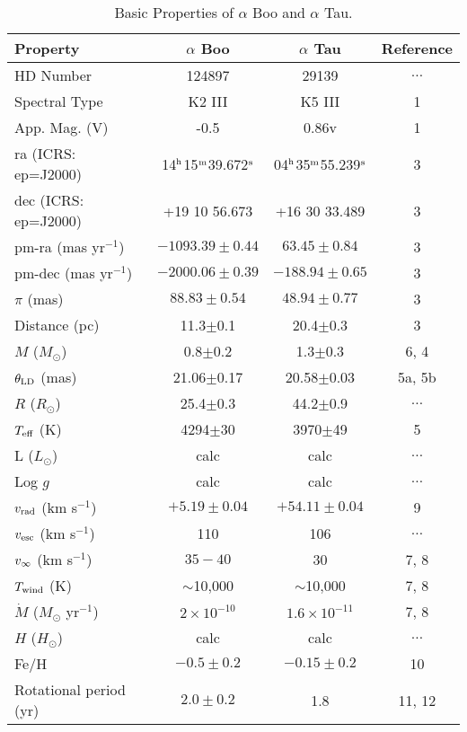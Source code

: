 \begin{table}[!hb]
\begin{center}
\caption[Basic Properties of $\alpha$ Boo and $\alpha$ Tau.]
{Basic Properties of $\alpha$ Boo and $\alpha$ Tau.}
\begin{tabular}{lccc}
\hline
\hline
\rule{0pt}{2.5ex}Property & $\alpha$ Boo & $\alpha$ Tau & Reference\\
\hline
\rule{0pt}{2.5ex}HD Number & 124897 & 29139 & $\ldots$\\
Spectral Type & K2 III & K5 III& 1\\ 
App. Mag. (V) & -0.5 & 0.86v & 1\\
ra (ICRS: ep=J2000)&14$^{\rm{h}}$15$^{\rm{m}}$39.672$^{\rm{s}}$&04$^{\rm{h}}$35$^{\rm{m}}$55.239$^{\rm{s}}$&3\\
dec (ICRS: ep=J2000) & +19 10 56.673 & +16 30 33.489 & 3 \\
pm-ra (mas yr$^{-1}$)& $-1093.39 \pm 0.44$ & $63.45\pm 0.84$  & 3 \\
pm-dec (mas yr$^{-1}$)& $-2000.06 \pm 0.39$ & $-188.94\pm 0.65$ & 3 \\
$\pi$ (mas)& $88.83\pm 0.54$ & $48.94\pm 0.77$& 3\\
Distance (pc)& 11.3$\pm$0.1 & 20.4$\pm$0.3& 3\\
$M$ ($M_{\odot}$) & 0.8$\pm$0.2 & 1.3$\pm$0.3& 6, 4 \\
$\theta _{\rm{LD}}$ (mas)& 21.06$\pm$0.17 & 20.58$\pm$0.03& 5a, 5b \\
$R$ ($R_{\odot}$)& 25.4$\pm$0.3 & 44.2$\pm$0.9 & $\ldots$ \\
$T_{\rm{eff}}$ (K) & 4294$\pm$30 & 3970$\pm$49& 5 \\
L ($L_{\odot}$)&calc &calc & $\ldots$\\
Log $g$ & calc& calc&$\ldots$\\
$v_{\rm{rad}}$ (km s$^{-1}$) & $+5.19 \pm 0.04$ & $+54.11\pm 0.04$ & 9\\
$v_{\rm{esc}}$ (km s$^{-1}$) &110 & 106& $\ldots$\\
$v_{\rm{\infty}}$ (km s$^{-1}$)& $35-40$ & 30& 7, 8\\
$T_{\rm{wind}}$ (K)& $\sim$10,000 & $\sim$10,000 & 7, 8\\
$\dot{M}$ ($M_{\odot}$ yr$^{-1}$)& $2\times 10^{-10}$& $1.6\times 10^{-11}$& 7, 8\\
$H$ ($H_{\odot}$)& calc& calc& $\ldots$\\
Fe/H& $-0.5\pm0.2$ & $- 0.15 \pm 0.2$ & 10\\
Rotational period (yr) & $2.0 \pm 0.2$ & 1.8 & 11, 12\\

\end{tabular}
\end{center}
\end{table}
